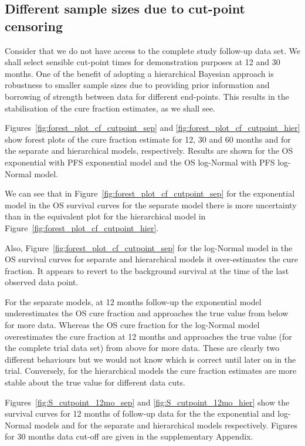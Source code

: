 \documentclass[AMA,STIX1COL]{WileyNJD-v2}
\begin{document}
%
\subsection{Different sample sizes due to cut-point censoring}
Consider that we do not have access to the complete study follow-up data set.
We shall select sensible cut-point times for demonstration purposes at 12 and 30 months.
One of the benefit of adopting a hierarchical Bayesian approach is robustness to smaller sample sizes due to providing prior information and borrowing of strength between data for different end-points.
This results in the stabilisation of the cure fraction estimates, as we shall see.

Figures~\ref{fig:forest_plot_cf_cutpoint_sep} and \ref{fig:forest_plot_cf_cutpoint_hier} show forest plots of the cure fraction estimate for 12, 30 and 60 months and for the separate and hierarchical models, respectively.
Results are shown for the OS exponential with PFS exponential model and the OS log-Normal with PFS log-Normal model.

We can see that in Figure~\ref{fig:forest_plot_cf_cutpoint_sep} for the exponential model in the OS survival curves for the separate model there is more uncertainty than in the equivalent plot for the hierarchical model in Figure~\ref{fig:forest_plot_cf_cutpoint_hier}.

Also, Figure~\ref{fig:forest_plot_cf_cutpoint_sep} for the log-Normal model in the OS survival curves for separate and hierarchical models it over-estimates the cure fraction. It appears to revert to the background survival at the time of the last observed data point.


For the separate models, at 12 months follow-up the exponential model underestimates the OS cure fraction and approaches the true value from below for more data.
Whereas the OS cure fraction for the log-Normal model overestimates the cure fraction at 12 months and approaches the true value (for the complete trial data set) from above for more data.
These are clearly two different behaviours but we would not know which is correct until later on in the trial.
Conversely, for the hierarchical models the cure fraction estimates are more stable about the true value for different data cuts.


Figures~\ref{fig:S_cutpoint_12mo_sep} and \ref{fig:S_cutpoint_12mo_hier} show
the survival curves for 12 months of follow-up data for the the exponential and log-Normal models and for the separate and hierarchical models respectively.
Figures for 30 months data cut-off are given in the supplementary Appendix.
\end{document}
